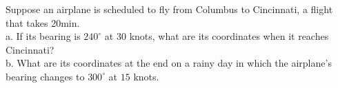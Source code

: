 \documentclass{ximera}
\author{Parisa Fatheddin}
\begin{document}
\begin{exercise}


Suppose an airplane is scheduled to fly from Columbus to Cincinnati, a flight that takes 20min. \\
a. If its bearing is $240^{\circ}$ at $30$ knots, what are its coordinates when it reaches Cincinnati?\\
b. What are its coordinates at the end on a rainy day in which the airplane's bearing changes to $300^{\circ}$ at $15$ knots. 






















\end{exercise}
\end{document}
